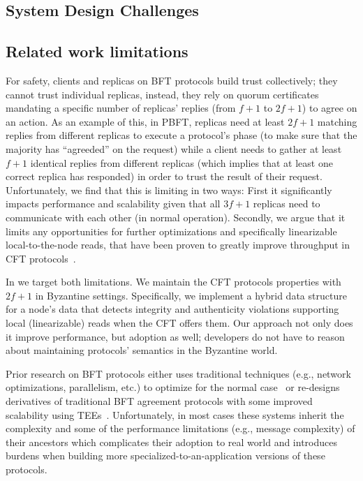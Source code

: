 \subsection{System Design Challenges}
\label{sec:motivation}
\subsection{Related work limitations}

 For safety, clients and replicas on BFT protocols build trust collectively; they cannot trust individual replicas, instead, they rely on quorum certificates mandating a specific number of replicas' replies (from $f+1$ to $2f+1$) to agree on an action. As an example of this, in PBFT, replicas need at least $2f+1$ matching replies from different replicas to execute a protocol's phase (to make sure that the majority has ``agreeded'' on the request) while a client needs to gather at least $f+1$ identical replies from different replicas (which implies that at least one correct replica has responded) in order to trust the result of their request. Unfortunately, we find that this is limiting in two ways: First it significantly impacts performance and scalability given that all $3f+1$ replicas need to communicate with each other (in normal operation). Secondly, we argue that it limits any opportunities for further optimizations and specifically linearizable local-to-the-node reads, that have been proven to greatly improve throughput in CFT protocols~\cite{}.
 
In \projecttitle{} we target both limitations. We maintain the CFT protocols properties with $2f+1$ in Byzantine settings. Specifically, we implement a hybrid data structure for a node's data that detects integrity and authenticity violations supporting  local (linearizable) reads when the CFT offers them. Our approach not only does it improve performance, but adoption as well; developers do not have to reason about maintaining protocols' semantics in the Byzantine world.


 Prior research on BFT protocols either uses traditional techniques (e.g., network optimizations, parallelism, etc.) to optimize for the normal case~\cite{} or re-designs derivatives of traditional BFT agreement protocols with some improved scalability using TEEs~\cite{}.  Unfortunately, in most cases these systems inherit the complexity and some of the performance limitations (e.g., message complexity) of their ancestors which complicates their adoption to real world and introduces burdens when building more specialized-to-an-application versions of these protocols. 

